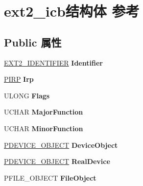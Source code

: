 \hypertarget{structext2__icb}{}\section{ext2\+\_\+icb结构体 参考}
\label{structext2__icb}
\subsection*{Public 属性}
\begin{DoxyCompactItemize}
\item 
\mbox{\label{structext2__icb_a5cff26fbcb4ccc43eb9786c661951ca4}} 
\hyperlink{struct___e_x_t2___i_d_e_n_t_i_f_i_e_r}{E\+X\+T2\+\_\+\+I\+D\+E\+N\+T\+I\+F\+I\+ER} {\bfseries Identifier}
\item 
\mbox{\label{structext2__icb_aaea695d2c8cc0615427ccd5ca96ed43a}} 
\hyperlink{interfacevoid}{P\+I\+RP} {\bfseries Irp}
\item 
\mbox{\label{structext2__icb_aa996b282c28f30d54628cdfa51aa90e4}} 
U\+L\+O\+NG {\bfseries Flags}
\item 
\mbox{\label{structext2__icb_a02908bdc2f84df597b54ef123871624b}} 
U\+C\+H\+AR {\bfseries Major\+Function}
\item 
\mbox{\label{structext2__icb_a5540c343e4c7cfcd029285824555a82f}} 
U\+C\+H\+AR {\bfseries Minor\+Function}
\item 
\mbox{\label{structext2__icb_a42e3291851066217f693082e04316a2a}} 
\hyperlink{struct___d_e_v_i_c_e___o_b_j_e_c_t}{P\+D\+E\+V\+I\+C\+E\+\_\+\+O\+B\+J\+E\+CT} {\bfseries Device\+Object}
\item 
\mbox{\label{structext2__icb_a00725e331fd8d4153e56b7bef43c343d}} 
\hyperlink{struct___d_e_v_i_c_e___o_b_j_e_c_t}{P\+D\+E\+V\+I\+C\+E\+\_\+\+O\+B\+J\+E\+CT} {\bfseries Real\+Device}
\item 
\mbox{\label{structext2__icb_ab82f26fc0b809e60cfeb7ffd2f1ffd3e}} 
P\+F\+I\+L\+E\+\_\+\+O\+B\+J\+E\+CT {\bfseries File\+Object}
\item 
\mbox{\label{structext2__icb_a204d8837c704626256c4e4b3f5f38dd8}} 

\end{DoxyCompactItemize}
